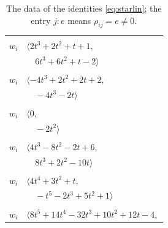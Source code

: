 \documentclass[11pt]{article}
\begin{document}
\begingroup\scriptsize
\setlength{\LTcapwidth}{\textwidth}
\begin{longtable}{@{}ll@{}}
\caption{The data of the identities \eqref{eq:starlin}; the entry $j{:}e$ means $\rho_{ij}=e\neq0$.}\label{tab:star}\\
\hline\endfirsthead\hline\endhead\hline\endfoot
\multicolumn{2}{@{}p{0.97\textwidth}@{}}{$i=0$, $D_i=2$, $\rho_{ij}$: $8{:}1, \allowbreak 9{:}2, \allowbreak 10{:}2, \allowbreak 13{:}1, \allowbreak 20{:}1, \allowbreak 26{:}2, \allowbreak 27{:}2$}\\
$w_i$ & $\langle 2t^{3}+2t^{2}+t+1,$\\
 & $\quad 6t^{3}+6t^{2}+t-2\rangle$\\
\addlinespace[2pt]
\multicolumn{2}{@{}p{0.97\textwidth}@{}}{$i=1$, $D_i=2$, $\rho_{ij}$: $4{:}2, \allowbreak 11{:}2, \allowbreak 13{:}1, \allowbreak 17{:}2, \allowbreak 20{:}2, \allowbreak 21{:}1, \allowbreak 22{:}2$}\\
$w_i$ & $\langle -4t^{3}+2t^{2}+2t+2,$\\
 & $\quad -4t^{3}-2t\rangle$\\
\addlinespace[2pt]
\multicolumn{2}{@{}p{0.97\textwidth}@{}}{$i=2$, $D_i=1$, $\rho_{ij}$: $17{:}1, \allowbreak 21{:}2$}\\
$w_i$ & $\langle 0,$\\
 & $\quad -2t^{2}\rangle$\\
\addlinespace[2pt]
\multicolumn{2}{@{}p{0.97\textwidth}@{}}{$i=3$, $D_i=2$, $\rho_{ij}$: $7{:}1, \allowbreak 9{:}1, \allowbreak 10{:}1, \allowbreak 14{:}2, \allowbreak 17{:}1, \allowbreak 18{:}2, \allowbreak 24{:}1$}\\
$w_i$ & $\langle 4t^{3}-8t^{2}-2t+6,$\\
 & $\quad 8t^{3}+2t^{2}-10t\rangle$\\
\addlinespace[2pt]
\multicolumn{2}{@{}p{0.97\textwidth}@{}}{$i=4$, $D_i=1$, $\rho_{ij}$: $1{:}1, \allowbreak 6{:}2, \allowbreak 11{:}1, \allowbreak 22{:}1, \allowbreak 24{:}2, \allowbreak 26{:}1, \allowbreak 27{:}2$}\\
$w_i$ & $\langle 4t^{4}+3t^{2}+t,$\\
 & $\quad -t^{5}-2t^{3}+5t^{2}+1\rangle$\\
\addlinespace[2pt]
\multicolumn{2}{@{}p{0.97\textwidth}@{}}{$i=5$, $D_i=2$, $\rho_{ij}$: $7{:}2, \allowbreak 9{:}2, \allowbreak 12{:}2, \allowbreak 13{:}2, \allowbreak 14{:}1, \allowbreak 19{:}1$}\\
$w_i$ & $\langle 8t^{5}+14t^{4}-32t^{3}+10t^{2}+12t-4,$\\

\end{longtable}
\end{document}
